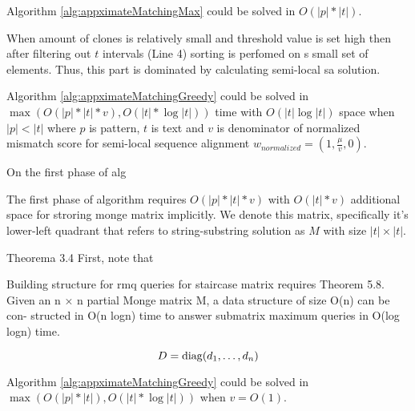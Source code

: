 \begin{corollary}
Algorithm \ref{alg:appximateMatchingMax} could  be solved in 
$O(|p| * |t|)$.

When amount of clones is relatively small and threshold value is set high  then after filtering out $t$ intervals (Line 4) sorting is perfomed on s small set of elements.
Thus, this part is dominated by calculating semi-local sa solution.
\end{corollary}




\begin{theorem}
Algorithm \ref{alg:appximateMatchingGreedy} could  be solved in 
$\max ( O(|p| * |t| * v), O(|t| * \log |t|))$ time with $ O(|t| \log |t|)$ space when $|p|<|t|$ where $p$ is pattern, $t$ is text and $v$ is denominator of normalized mismatch score for semi-local sequence alignment
$w_{normalized} = (1,\frac{\mu}{v},0)$.

On the first phase of alg

The first phase of algorithm requires $O(|p| * |t| * v)$ with $O(|t| * v)$ additional space for stroring monge matrix implicitly.
We denote this matrix, specifically it's lower-left quadrant that refers to
string-substring solution as $M$ with size $|t| \times |t|$.


  Theorema 3.4
First, note that 

Building structure for rmq queries for staircase matrix requires 
Theorem 5.8. Given an n × n partial Monge matrix M, a data structure of size O(n) can be con-
structed in O(n logn) time to answer submatrix maximum queries in O(log logn) time.
   

\begin{displaymath}
    D = \operatorname{diag}(d_1,\dots,d_n)
  \end{displaymath}
\end{theorem}


\begin{corollary}
Algorithm \ref{alg:appximateMatchingGreedy} could  be solved in 
$\max ( O(|p| * |t|), O(|t| * \log |t|))$ when $v = O(1)$.

\end{corollary}




  


 
